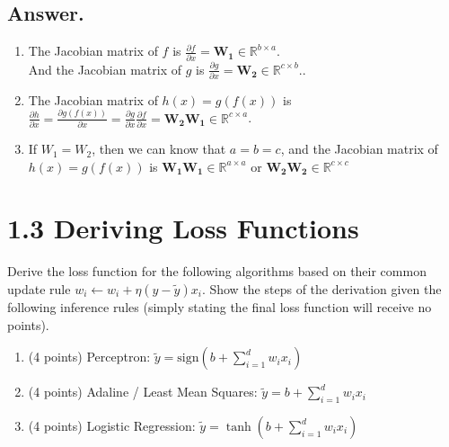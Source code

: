 \documentclass{article}
\begin{document}
\begin{itemize}
    \subsection*{Answer.}
    \begin{enumerate}
        \item The Jacobian matrix of \(f\) is \(\frac{\partial f}{\partial x} = \mathbf{W_1} \in \mathbb{R}^{b \times a}\).\\
        And the Jacobian matrix of \(g\) is \(\frac{\partial g}{\partial x} = \mathbf{W_2} \in \mathbb{R}^{c \times b}\)..
        \item The Jacobian matrix of \(h(x) = g(f(x))\) is \(\frac{\partial h}{\partial x} = \frac{\partial g(f(x))}{\partial x} = \frac{\partial g}{\partial x} \frac{\partial f}{\partial x} = \mathbf{W_2} \mathbf{W_1} \in \mathbb{R}^{c \times a}\).
        \item If \(W_1 = W_2\), then we can know that \(a = b = c\), and the Jacobian matrix of \(h(x) = g(f(x))\) is \(\mathbf{W_1} \mathbf{W_1} \in \mathbb{R}^{a \times a}\) or \(\mathbf{W_2} \mathbf{W_2} \in \mathbb{R}^{c \times c}\)
    \end{enumerate}



\end{itemize}

\section*{1.3 Deriving Loss Functions}

Derive the loss function for the following algorithms based on their common update rule $w_i \leftarrow w_i + \eta (y - \tilde{y}) x_i$. Show the steps of the derivation given the following inference rules (simply stating the final loss function will receive no points).

\begin{enumerate}
    \item (4 points) Perceptron: $\tilde{y} = \text{sign}(b + \sum_{i=1}^{d} w_i x_i)$
    \item (4 points) Adaline / Least Mean Squares: $\tilde{y} = b + \sum_{i=1}^{d} w_i x_i$
    \item (4 points) Logistic Regression: $\tilde{y} = \tanh(b + \sum_{i=1}^{d} w_i x_i)$
\end{enumerate}

\end{document}
